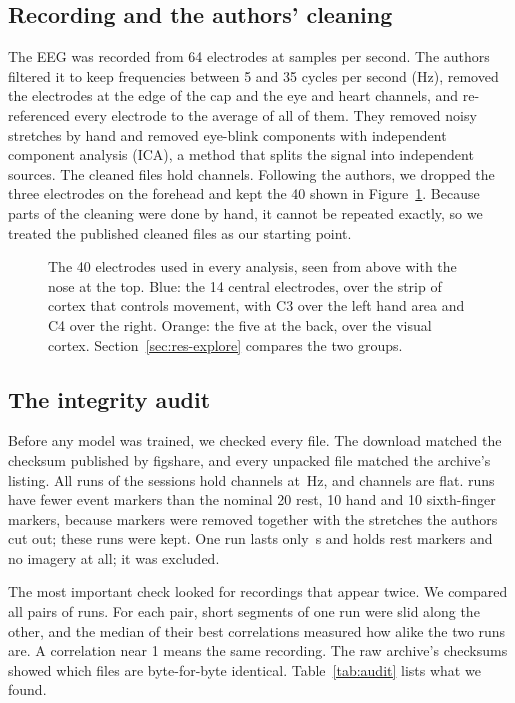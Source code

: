 \subsection{Recording and the authors' cleaning}
The EEG was recorded from 64 electrodes at \nSamplingRate{} samples per second. The
authors filtered it to keep frequencies between 5 and 35 cycles per second (Hz), removed
the electrodes at the edge of the cap and the eye and heart channels, and re-referenced
every electrode to the average of all of them. They removed noisy stretches by hand and
removed eye-blink components with independent component analysis (ICA), a method that
splits the signal into independent sources. The cleaned files hold \nChannelsFile{}
channels. Following the authors, we dropped the three electrodes on the forehead and kept
the 40 shown in Figure~\ref{fig:montage}. Because parts of the cleaning were done by hand,
it cannot be repeated exactly, so we treated the published cleaned files as our starting
point.

\begin{figure}[tbp]
  \centering
  
  \caption[The 40 electrodes used in every analysis]{The 40 electrodes used in every analysis,
  seen from above with the nose at the top. Blue: the 14 central electrodes, over the strip of
  cortex that controls movement, with C3 over the left hand area and C4 over the right.
  Orange: the five at the back, over the visual cortex. Section~\ref{sec:res-explore}
  compares the two groups.}
  \label{fig:montage}
\end{figure}

\subsection{The integrity audit}
Before any model was trained, we checked every file. The download matched the checksum
published by figshare, and every unpacked file matched the archive's listing. All
\nRuns{} runs of the \nSessions{} sessions hold \nChannelsFile{} channels at
\nSamplingRate{}\,Hz, and \auditFlatChannels{} channels are flat. \auditFewerEventsRuns{}
runs have fewer event markers than the nominal 20 rest, 10 hand and 10 sixth-finger
markers, because markers were removed together with the stretches the authors cut out;
these runs were kept. One run lasts only \auditDegenerateSeconds{}\,s and holds
\auditDegenerateRestMarkers{} rest markers and no imagery at all; it was excluded.

The most important check looked for recordings that appear twice. We compared all
\auditPairsScreened{} pairs of runs. For each pair, short segments of one run were slid
along the other, and the median of their best correlations measured how alike the two
runs are. A correlation near 1 means the same recording. The raw archive's checksums
showed which files are byte-for-byte identical. Table~\ref{tab:audit} lists what we found.

